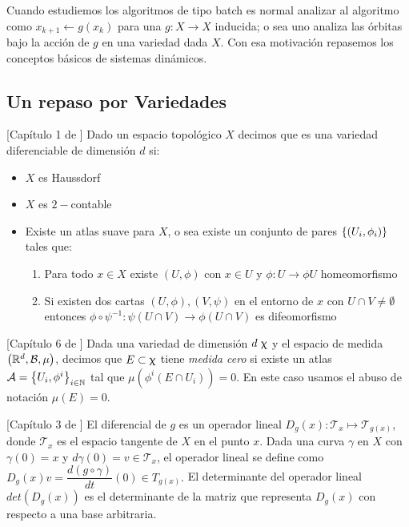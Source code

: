 Cuando estudiemos los algoritmos de tipo batch es normal analizar al algoritmo como $x_{k+1} \gets g(x_k)$ para una $g : X \rightarrow X$ inducida; o sea uno analiza las \'orbitas bajo la acci\'on de $g$ en una variedad dada $X$. Con esa motivaci\'on repasemos los conceptos b\'asicos de sistemas din\'amicos.

\subsection{Un repaso por Variedades}

\begin{definition}{[Cap\'itulo 1 de \cite{lee:00}]}
	Dado un espacio topol\'ogico $X$ decimos que es una variedad diferenciable de dimensi\'on $d$ si:
	
	\begin{itemize}
		\item $X$ es Haussdorf
		\item $X$ es $2-$contable
		\item Existe un atlas suave para $X$, o sea existe un conjunto de pares $\left\lbrace\left(U_i, \phi_i\right)\right\rbrace$ tales que:
		
		\begin{enumerate}
			\item Para todo $x \in X$ existe $(U,\phi)$ con $x \in U$ y $\phi: U \rightarrow \phi{U}$ homeomorfismo
			\item Si existen dos cartas $(U,\phi), (V,\psi)$ en el entorno de $x$ con $U \cap V \neq \emptyset$ entonces $\phi \circ \psi^{-1} : \psi(U\cap V )\rightarrow \phi(U\cap V)$ es difeomorfismo
		\end{enumerate}
	\end{itemize}
	
\end{definition}

\begin{definition}{[Cap\'itulo 6 de \cite{lee:00}]}
	Dada una variedad de dimensi\'on $d \ \upchi$ y el espacio de medida $\left({\mathbb{R}}^d, \mathcal{B}, \mu\right)$, decimos que $E \subset \upchi$ tiene \textit{medida cero} si existe un atlas $\mathcal{A} = \left\lbrace U_i, \phi^i\right\rbrace_{i \in {\mathbb{N}}}$ tal que $\mu \left(\phi^i \left(E \cap U_i \right) \right) = 0$. En este caso usamos el abuso de notaci\'on $\mu(E) = 0$.
\end{definition}

\begin{definition}{[Cap\'itulo 3 de \cite{lee:00}]}
	El diferencial de $g$ es un operador lineal $D_g(x): \mathcal{T}_x \mapsto \mathcal{T}_{g (x)}$, donde $\mathcal{T}_x$ es el espacio tangente de $X$ en el punto $x$. Dada una curva $\gamma$
	en $X$ con $\gamma(0) = x$ y $d\gamma(0) = v \in \mathcal{T}_x$, el operador lineal se define como $D_g(x)v = \dfrac{d (g\circ \gamma)}{dt}(0) \in T_{g (x)}.$ El determinante del operador lineal $det (D_g (x))$ es el determinante de la matriz que representa $D_g (x)$ con respecto a una base arbitraria.
\end{definition}

